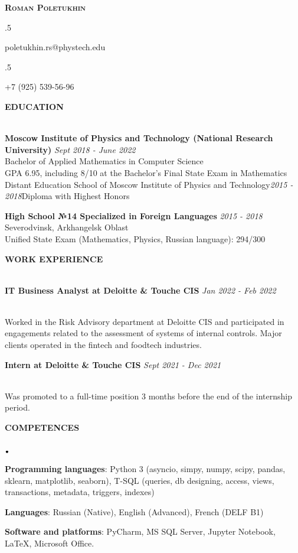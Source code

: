 \documentclass[11pt]{article}
\newcommand{\lineunder}{\vspace*{-8pt} \\ \hspace*{-18pt} \hrulefill \\}
\newcommand{\header}[1]{{\hspace*{-15pt}\vspace*{6pt} \textsc{#1}} \vspace*{-6pt} \lineunder}
\newcommand{\contact}[2]{
\begin{center}
{\LARGE \scshape {#1}}\\
#2
\end{center}
\vspace*{-8pt}
}
\newcommand{\lbt}{\,\begin{picture}(-1,1)(-1,-3)\circle*{3}\end{picture}\ }
\newenvironment{achievements}{
    \begin{list}{$\lbt$}{
        \topsep 0pt
        \itemsep 0pt
        \addtolength{\leftmargin}{-0.1in}
    }
}
{
    \vspace*{4pt}
    \end{list}
}
\newcommand{\schoolwithcourses}[4]{
 \textbf{#1} \hfill{#2}\\
    #3\\
\vspace*{5pt}
}
\begin{document}

\small
\smallskip
\vspace*{-35pt}
\vspace{2mm}
\vspace{2mm}
\contact{\textbf{Roman Poletukhin}}
{}
\moveleft.5\hoffset\centerline{poletukhin.rs@phystech.edu}
\moveleft.5\hoffset\centerline{+7 (925) 539-56-96}
\vspace{2mm}


\header{\textbf{EDUCATION}}
\vspace{2mm}
\schoolwithcourses{Moscow Institute of Physics and Technology (National Research University)}{\textit{Sept 2018 - June 2022}}{Bachelor of Applied Mathematics in Computer Science \\ GPA 6.95, including 8/10 at the Bachelor's Final State Exam in Mathematics}


\schoolwithcourses{Distant Education School of Moscow Institute of Physics and Technology}{\textit{2015 - 2018}}{Diploma with Highest Honors}


\schoolwithcourses{High School №14 Specialized in Foreign Languages}{\textit{2015 - 2018}}{Severodvinsk, Arkhangelsk Oblast \\ Unified State Exam (Mathematics, Physics, Russian language): 294/300}
\hfill{}
\vspace{2mm}

\header{\textbf{WORK EXPERIENCE}}
\vspace{2mm}
\schoolwithcourses{IT Business Analyst at Deloitte \& Touche CIS}{\textit{Jan 2022 - Feb 2022}}
\vspace{1mm}
{Worked in the Risk Advisory department at Deloitte CIS and participated in engagements related to the assessment of systems of internal controls. Major clients operated in the fintech and foodtech industries.}

\vspace{2mm}
\schoolwithcourses{Intern at Deloitte \& Touche CIS}{\textit{Sept 2021 - Dec 2021}}
\vspace{1mm}
{Was promoted to a full-time position 3 months before the end of the internship period.}

\hfill{}
\vspace{2mm}


\header{\textbf{COMPETENCES}}
\vspace{2mm}
\begin{achievements}
\justifying
\item \textbf{Programming languages}: Python 3 (asyncio, simpy, numpy, scipy, pandas, sklearn, matplotlib, seaborn), T-SQL (queries, db designing, access, views, transactions, metadata, triggers, indexes)
\item \textbf{Languages}: Russian (Native), English (Advanced), French (DELF B1) 
\item \textbf{Software and platforms}: PyCharm, MS SQL Server, Jupyter Notebook, \LaTeX, Microsoft Office.
\end{achievements}
\hfill{}
\end{document}
